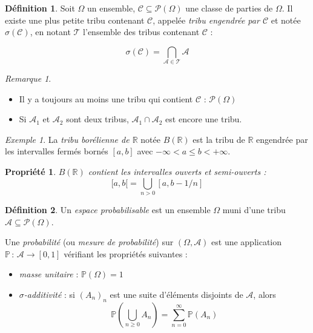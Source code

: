 \documentclass[]{article}
\newtheorem{myproperty}{Propriété}
\theoremstyle{remark}
\newtheorem{myrem}{Remarque}
\newtheorem{myexmpl}{Exemple}
\theoremstyle{definition}
\newtheorem{mydef}{Définition}
\newcommand{\funcshort}[3]{
	#1 \, : \, #2 \longrightarrow #3
}
\begin{document}
\begin{mydef}
	Soit $\Omega$ un ensemble, $\mathcal{C} \subseteq \mathcal{P}(\Omega)$ une classe de parties de $\Omega$. Il existe une plus petite tribu contenant $\mathcal{C}$, appelée \textit{tribu engendrée par $\mathcal{C}$} et notée $\sigma(\mathcal{C})$, en notant $\mathcal{T}$ l'ensemble des tribus contenant $\mathcal{C}$ :
	
	$$\sigma(\mathcal{C}) = \bigcap_{\mathcal{A} \in \mathcal{T}} \mathcal{A}$$
\end{mydef}

\begin{myrem}
	\leavevmode
	\begin{itemize}
		\item Il y a toujours au moins une tribu qui contient $\mathcal{C}$ : $\mathcal{P}(\Omega)$
		\item Si $\mathcal{A}_1$ et $\mathcal{A}_2$ sont deux tribus, $\mathcal{A}_1 \cap \mathcal{A}_2$ est encore une tribu.
	\end{itemize}
\end{myrem}

\begin{myexmpl}
	La \textit{tribu borélienne de $\mathbb{R}$} notée $B(\mathbb{R})$ est la tribu de $\mathbb{R}$ engendrée par les intervalles fermés bornés $[a,b]$ avec $-\infty < a \leqslant b < +\infty$.
\end{myexmpl}

\begin{myproperty}
	\item $B(\mathbb{R})$ contient les intervalles ouverts et semi-ouverts :
	$$[a, b[ = \bigcup_{n > 0} [a, b - 1/n]$$
\end{myproperty}

\begin{mydef}
	Un \textit{espace probabilisable} est un ensemble $\Omega$ muni d'une tribu $\mathcal{A} \subseteq \mathcal{P}(\Omega)$.
	
	Une \textit{probabilité} (ou \textit{mesure de probabilité}) sur $(\Omega, \mathcal{A})$ est une application $\funcshort{\mathbb{P}}{\mathcal{A}}{[0, 1]}$ vérifiant les propriétés suivantes :
	\begin{itemize}
		\item \textit{masse unitaire} : $\mathbb{P}(\Omega)=1$
		\item \textit{$\sigma$-additivité} : si $(A_n)_n$ est une suite d'éléments disjoints de $\mathcal{A}$, alors $$\mathbb{P}\left(\bigcup_{n \geqslant 0} A_n\right) = \sum_{n = 0}^{\infty} \mathbb{P}(A_n)$$
	\end{itemize}
\end{mydef}
\end{document}
